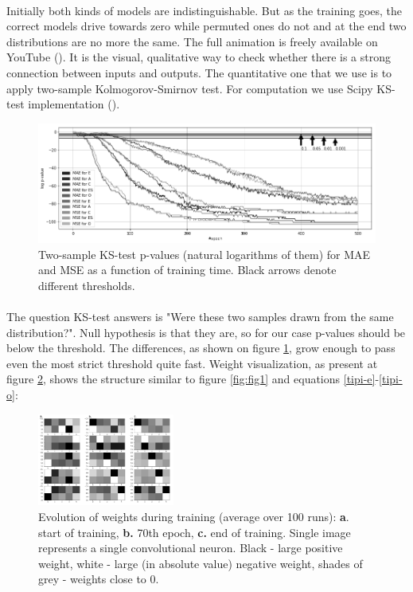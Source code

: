 \documentclass{llncs}
\begin{document}
\paragraph{}
Initially both kinds of models are indistinguishable. But as the training goes, the correct models drive towards zero while permuted ones do not and at the end two distributions are no more the same. The full animation is freely available on YouTube (\cite{Divergence}). It is the visual, qualitative way to check whether there is a strong connection between inputs and outputs. The quantitative one that we use is to apply two-sample Kolmogorov-Smirnov test. For computation we use Scipy KS-test implementation (\cite{jones2014scipy}).

\begin{figure}[H]
	\centering
	\includegraphics[width=\textwidth]{figures/pvalues.png}
	\caption{Two-sample KS-test p-values (natural logarithms of them) for MAE and MSE as a function of training time. Black arrows denote different thresholds.}
	\label{fig:fig5}
\end{figure}

\paragraph{}
The question KS-test answers is "Were these two samples drawn from the same distribution?". Null hypothesis is that they are, so for our case p-values should be below the threshold. The differences, as shown on figure \ref{fig:fig5}, grow enough to pass even the most strict threshold quite fast. Weight visualization, as present at figure \ref{fig:fig6}, shows the structure similar to figure \ref{fig:fig1} and equations \ref{tipi-e}-\ref{tipi-o}:

\begin{figure}[H]
	\centering
	\includegraphics[width=0.4\textwidth]{figures/interpretation.png}
	\caption{Evolution of weights during training (average over 100 runs): \textbf{a}. start of training, \textbf{b.} 70th epoch, \textbf{c.} end of training. Single image represents a single convolutional neuron. Black - large positive weight, white - large (in absolute value) negative weight, shades of grey - weights close to 0.}
	\label{fig:fig6}
\end{figure}
\end{document}
